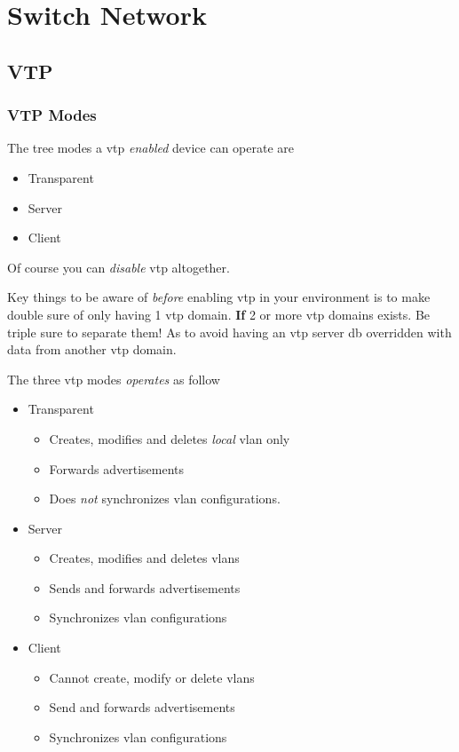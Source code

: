 \section{Switch Network}

\subsection{VTP}

\subsubsection{VTP Modes}
The tree modes a \gls{vtp} \textit{enabled} device can operate are
\begin{itemize}
    \item Transparent
    \item Server
    \item Client
\end{itemize}
Of course you can \textit{disable} \gls{vtp} altogether.

Key things to be aware of \textit{before} enabling \gls{vtp} in your environment is to make double sure of only having 1 \gls{vtp} domain. \textbf{If} 2 or more \gls{vtp} domains exists. Be triple sure to separate them! As to avoid having an \gls{vtp} server \gls{db} overridden with data from another \gls{vtp} domain.

The three \gls{vtp} modes \textit{operates} as follow
\begin{itemize}
    \item Transparent
    \begin{itemize}
        \item Creates, modifies and deletes \textit{local} \gls{vlan} only
        \item Forwards advertisements
        \item Does \textit{not} synchronizes vlan configurations.
    \end{itemize}
    \item Server
    \begin{itemize}
        \item Creates, modifies and deletes vlans
        \item Sends and forwards advertisements
        \item Synchronizes vlan configurations
    \end{itemize}
    \item Client
    \begin{itemize}
        \item Cannot create, modify or delete vlans
        \item Send and forwards advertisements
        \item Synchronizes vlan configurations
    \end{itemize}
\end{itemize}

